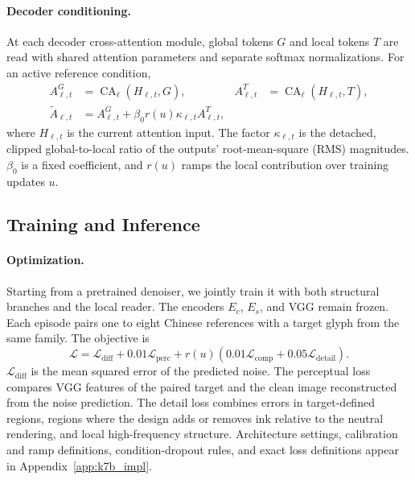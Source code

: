 \documentclass{article}
\begin{document}
\paragraph{Decoder conditioning.}
At each decoder cross-attention module, global tokens $G$ and local tokens $T$ are read with shared attention parameters and separate softmax normalizations.
For an active reference condition,
\begin{equation}
\begin{aligned}
A^G_{\ell,t}
&=
\operatorname{CA}_\ell(H_{\ell,t},G),
&
A^T_{\ell,t}
&=
\operatorname{CA}_\ell(H_{\ell,t},T),\\
\widetilde A_{\ell,t}
&=
A^G_{\ell,t}
+\beta_0r(u)\kappa_{\ell,t}A^T_{\ell,t},
\end{aligned}
\label{eq:inject}
\end{equation}
where $H_{\ell,t}$ is the current attention input.
The factor $\kappa_{\ell,t}$ is the detached, clipped global-to-local ratio of the outputs' root-mean-square (RMS) magnitudes.
$\beta_0$ is a fixed coefficient, and $r(u)$ ramps the local contribution over training updates $u$.


\subsection{Training and Inference}
\label{sec:training-inference}

\paragraph{Optimization.}
Starting from a pretrained denoiser, we jointly train it with both structural branches and the local reader.
The encoders $E_c$, $E_s$, and VGG remain frozen.
Each episode pairs one to eight Chinese references with a target glyph from the same family.
The objective is
\begin{equation}
\mathcal L
=
\mathcal L_{\mathrm{diff}}
+0.01\mathcal L_{\mathrm{perc}}
+r(u)\!\left(
    0.01\mathcal L_{\mathrm{comp}}
    +0.05\mathcal L_{\mathrm{detail}}
\right).
\label{eq:objective}
\end{equation}
$\mathcal L_{\mathrm{diff}}$ is the mean squared error of the predicted noise.
The perceptual loss compares VGG features of the paired target and the clean image reconstructed from the noise prediction.
The detail loss combines errors in target-defined regions, regions where the design adds or removes ink relative to the neutral rendering, and local high-frequency structure.
Architecture settings, calibration and ramp definitions, condition-dropout rules, and exact loss definitions appear in Appendix~\ref{app:k7b_impl}.
\end{document}
